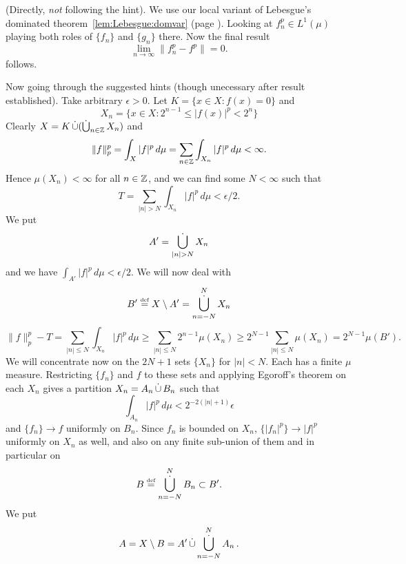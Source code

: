 \begin{enumerate}
\begin{itemize}
 (Directly, \emph{not} following the hint). We use our local variant of Lebesgue's
 dominated theorem~\ref{lem:Lebesgue:domvar} (page \pageref{lem:Lebesgue:domvar}).
 Looking at \(f_n^p\in L^1(\mu)\) playing both roles of
 \(\{f_n\}\) and \(\{g_n\}\) there. Now the final result
 \begin{equation*}
  \lim_{n\to\infty} \|f_n^p - f^p \| = 0.
 \end{equation*}
 follows.


 Now going through the suggested hints
 (though unecessary after result established).
 Take arbitrary \(\epsilon > 0\).
 Let \(K= \{x\in X: f(x)=0\}\) and
 \begin{equation*}
   X_n = \{x\in X: 2^{n-1} \leq |f(x)|^p < 2^n\}
 \end{equation*}
 Clearly \(X = K \disjunion (\Disjunion_{n\in\Z} X_n)\) and
 \begin{equation*}
  \|f\|_p^p = \int_X |f|^p\,d\mu = \sum_{n\in\mathbb{Z}} \int_{X_n} |f|^p\,d\mu < \infty.
 \end{equation*}
 Hence \(\mu(X_n) < \infty\) for all \(n\in\mathbb{Z}\),
 and we can find some \(N<\infty\) such that
 \begin{equation*}
  T = \sum_{|n|>N} \int_{X_n} |f|^p\,d\mu < \epsilon/2.
 \end{equation*}
 We put
 \begin{equation*}
   A' = \Disjunion_{|n|>N} X_n
 \end{equation*}
 and we have \(\int_{A'} |f|^p\,d\mu < \epsilon/2\).
 We will now deal with
 \begin{equation*}
   B' \eqdef X \setminus A' = \Disjunion_{n = -N}^N X_n
 \end{equation*}
 \begin{equation*}
 \|f\|_p^p - T
  = \sum_{|n|\leq N} \int_{X_n} |f|^p\,d\mu
  \geq \sum_{|n|\leq N} 2^{n-1}\mu(X_n)
  \geq 2^{N-1} \sum_{|n|\leq N} \mu(X_n)
  = 2^{N-1} \mu(B').
 \end{equation*}
 We will concentrate now on the \(2N+1\) sets \(\{X_n\}\) for \(|n|<N\).
 Each has a finite \(\mu\) measure.
 Restricting \(\{f_n\}\) and $f$ to these sets and applying Egoroff's theorem
 on each \(X_n\)
 gives a partition \(X_n = A_n \disjunion B_n\)
 such that
 \begin{equation*}
    \int_{A_n} |f|^p\,d\mu < 2^{-2(|n| + 1)}\epsilon
 \end{equation*}
 and \(\{f_n\}\to f\) uniformly on \(B_n\).
 Since \(f_n\) is bounded on \(X_n\),
 \(\{|f_n|^p\}\to |f|^p\) uniformly on \(X_n\) as well,
 and also on any finite sub-union of them
 and in particular on
 \begin{equation*}
  B \eqdef \Disjunion_{n= -N}^N B_n \subset B'.
 \end{equation*}
 We put
 \begin{equation*}
  A = X \setminus B = A' \disjunion \Disjunion_{n= -N}^N A_n\,.
 \end{equation*}


\end{itemize}
\end{enumerate}
